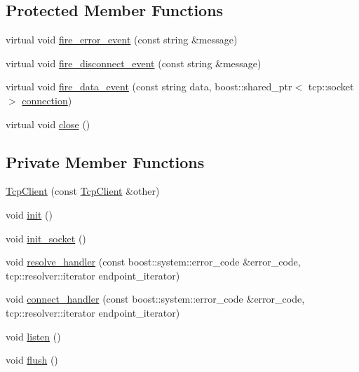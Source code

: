 \subsection*{Protected Member Functions}
\begin{DoxyCompactItemize}
\item 
virtual void \hyperlink{classTcpClient_a03a3ef57b2df46a21e21640362457871}{fire\_\-error\_\-event} (const string \&message)
\item 
virtual void \hyperlink{classTcpClient_a279302da46c29b24b539b4e7ddf20b94}{fire\_\-disconnect\_\-event} (const string \&message)
\item 
virtual void \hyperlink{classTcpClient_a8085a788062b837c12040533a18aa933}{fire\_\-data\_\-event} (const string data, boost::shared\_\-ptr$<$ tcp::socket $>$ \hyperlink{classTcpClient_add183a7de092c7c13ae6ab90766c9881}{connection})
\item 
virtual void \hyperlink{classTcpClient_a1ee082bbca3927811bbe2c0aa75386c4}{close} ()
\end{DoxyCompactItemize}
\subsection*{Private Member Functions}
\begin{DoxyCompactItemize}
\item 
\hyperlink{classTcpClient_a430902765fe325faf409fce8aa3374d2}{TcpClient} (const \hyperlink{classTcpClient}{TcpClient} \&other)
\item 
void \hyperlink{classTcpClient_aeac8e51b95f1ced1141a02ac934bc46d}{init} ()
\item 
void \hyperlink{classTcpClient_a1f9f4dc2af0e396f2c3a46a1e47b68d7}{init\_\-socket} ()
\item 
void \hyperlink{classTcpClient_a4bdf8c1ccee6d9cdb9a2220a95814f0e}{resolve\_\-handler} (const boost::system::error\_\-code \&error\_\-code, tcp::resolver::iterator endpoint\_\-iterator)
\item 
void \hyperlink{classTcpClient_a95419f512dec781b141a4beeea05c9a5}{connect\_\-handler} (const boost::system::error\_\-code \&error\_\-code, tcp::resolver::iterator endpoint\_\-iterator)
\item 
void \hyperlink{classTcpClient_a22407ce44587c805c32009fffe79a95f}{listen} ()
\item 
void \hyperlink{classTcpClient_a8272c8570d9f57b40230ff17b3a42156}{flush} ()
\end{DoxyCompactItemize}
